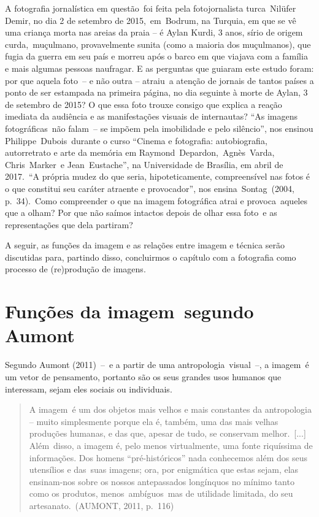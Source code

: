 \documentclass[
  letterpaper,
]{scrbook}
\begin{document}
A fotografia jornalística em questão~foi feita pela fotojornalista
turca~Nilüfer Demir, no dia 2 de setembro de 2015,~em~Bodrum, na
Turquia, em que se vê uma criança morta nas areias da praia -- é Aylan
Kurdi, 3 anos, sírio de origem curda,~muçulmano, provavelmente sunita
(como a maioria dos muçulmanos), que fugia da guerra em seu país e
morreu após o barco em que viajava com a família e mais algumas pessoas
naufragar. E as perguntas que guiaram este estudo foram: por que aquela
foto~-- e não outra -- atraiu~a atenção de jornais de tantos países a
ponto de ser estampada na primeira página, no dia seguinte à morte de
Aylan, 3 de setembro de 2015? O que essa foto trouxe consigo que explica
a reação imediata da audiência e as manifestações visuais de
internautas? ``As imagens fotográficas~não falam~-- se impõem pela
imobilidade e pelo silêncio'', nos ensinou Philippe~Dubois~durante o
curso ``Cinema e fotografia: autobiografia, autorretrato e arte da
memória em Raymond~Depardon,~Agnès~Varda, Chris~Marker~e
Jean~Eustache'', na Universidade de Brasília, em abril de 2017.~``A
própria mudez do que seria, hipoteticamente, compreensível nas fotos é o
que constitui seu caráter atraente e provocador'', nos
ensina~Sontag~(2004, p.~34).~Como compreender o que na imagem
fotográfica atrai e provoca~aqueles que a olham? Por que não saímos
intactos depois de olhar essa foto~e as representações que dela
partiram?

A seguir, as funções da imagem e as relações entre imagem e técnica
serão discutidas para, partindo disso, concluirmos o capítulo com a
fotografia como processo de (re)produção de imagens.~ ~

\hypertarget{funuxe7uxf5es-da-imagem-segundo-aumont}{%
\section{Funções da imagem~segundo
Aumont~}\label{funuxe7uxf5es-da-imagem-segundo-aumont}}

Segundo Aumont (2011)~--~e a partir de uma antropologia~visual~--, a
imagem~é um vetor de pensamento, portanto são os seus grandes usos
humanos que interessam, sejam eles sociais ou individuais.~ ~

\begin{quote}
A imagem~é um dos objetos mais velhos e mais constantes da antropologia
-- muito simplesmente porque ela é, também, uma das mais velhas
produções humanas, e das que, apesar de tudo, se conservam
melhor.~{[}...{]} Além~disso, a imagem é, pelo menos virtualmente, uma
fonte riquíssima de informações. Dos homens ``pré-históricos'' nada
conhecemos além dos seus utensílios e das~suas imagens; ora, por
enigmática que estas sejam, elas ensinam-nos sobre os nossos
antepassados longínquos no mínimo tanto como os produtos,
menos~ambíguos~mas de utilidade limitada, do seu artesanato.~(AUMONT,
2011, p.~116)~ ~
\end{quote}
\end{document}
